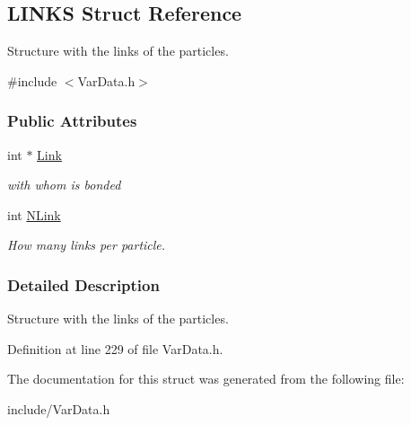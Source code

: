 \hypertarget{structLINKS}{}\subsection{L\+I\+N\+KS Struct Reference}
\label{structLINKS}


Structure with the links of the particles.  




{\ttfamily \#include $<$Var\+Data.\+h$>$}

\subsubsection*{Public Attributes}
\begin{DoxyCompactItemize}
\item 
int $\ast$ \hyperlink{structLINKS_aefc83dee460fda66ca240e011e7ce0a7}{Link}\hypertarget{structLINKS_aefc83dee460fda66ca240e011e7ce0a7}{}\label{structLINKS_aefc83dee460fda66ca240e011e7ce0a7}

\begin{DoxyCompactList}\small\item\em with whom is bonded \end{DoxyCompactList}\item 
int \hyperlink{structLINKS_a73918a2decc99bcf2317d2855dada6c8}{N\+Link}\hypertarget{structLINKS_a73918a2decc99bcf2317d2855dada6c8}{}\label{structLINKS_a73918a2decc99bcf2317d2855dada6c8}

\begin{DoxyCompactList}\small\item\em How many links per particle. \end{DoxyCompactList}\end{DoxyCompactItemize}


\subsubsection{Detailed Description}
Structure with the links of the particles. 

Definition at line 229 of file Var\+Data.\+h.



The documentation for this struct was generated from the following file\+:\begin{DoxyCompactItemize}
\item 
include/Var\+Data.\+h\end{DoxyCompactItemize}
